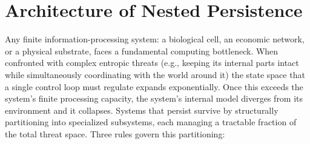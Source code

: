 \section{Architecture of Nested Persistence}
\label{sec:nested_persistence}
Any finite information-processing system: a biological cell, an economic network, or a physical substrate, faces a fundamental computing bottleneck. When confronted with complex entropic threats (e.g., keeping its internal parts intact while simultaneously coordinating with the world around it) the state space that a single control loop must regulate expands exponentially. Once this exceeds the system's finite processing capacity, the system's internal model diverges from its environment and it collapses. Systems that persist survive 
by structurally partitioning into specialized subsystems, each managing a tractable fraction of the total threat space. Three rules govern this partitioning:

